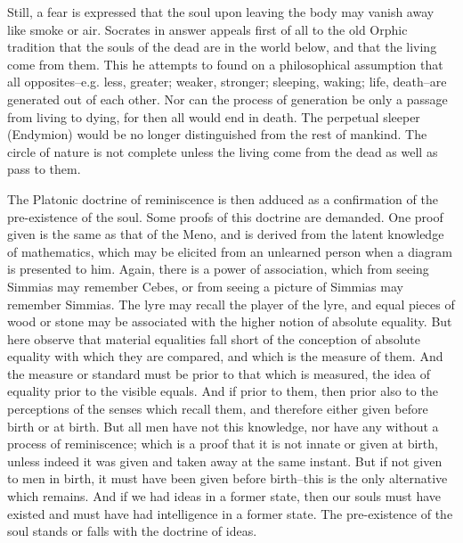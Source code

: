 Still, a fear is expressed that the soul upon leaving the body may
vanish away like smoke or air. Socrates in answer appeals first of all
to the old Orphic tradition that the souls of the dead are in the world
below, and that the living come from them. This he attempts to found
on a philosophical assumption that all opposites--e.g. less, greater;
weaker, stronger; sleeping, waking; life, death--are generated out of
each other. Nor can the process of generation be only a passage from
living to dying, for then all would end in death. The perpetual sleeper
(Endymion) would be no longer distinguished from the rest of mankind.
The circle of nature is not complete unless the living come from the
dead as well as pass to them.

The Platonic doctrine of reminiscence is then adduced as a confirmation
of the pre-existence of the soul. Some proofs of this doctrine are
demanded. One proof given is the same as that of the Meno, and is
derived from the latent knowledge of mathematics, which may be elicited
from an unlearned person when a diagram is presented to him. Again,
there is a power of association, which from seeing Simmias may remember
Cebes, or from seeing a picture of Simmias may remember Simmias. The
lyre may recall the player of the lyre, and equal pieces of wood or
stone may be associated with the higher notion of absolute equality. But
here observe that material equalities fall short of the conception of
absolute equality with which they are compared, and which is the measure
of them. And the measure or standard must be prior to that which is
measured, the idea of equality prior to the visible equals. And if prior
to them, then prior also to the perceptions of the senses which recall
them, and therefore either given before birth or at birth. But all men
have not this knowledge, nor have any without a process of reminiscence;
which is a proof that it is not innate or given at birth, unless indeed
it was given and taken away at the same instant. But if not given to
men in birth, it must have been given before birth--this is the only
alternative which remains. And if we had ideas in a former state, then
our souls must have existed and must have had intelligence in a former
state. The pre-existence of the soul stands or falls with the doctrine
of ideas.

